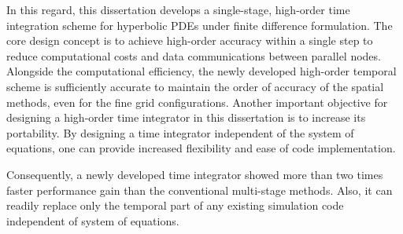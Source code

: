 In this regard, this dissertation develops a single-stage, high-order time integration scheme
for hyperbolic PDEs under finite difference formulation. The core design concept
is to achieve high-order accuracy within a single step
to reduce computational costs and data communications between parallel nodes.
Alongside the computational efficiency, the newly developed high-order temporal scheme is
sufficiently accurate to maintain the order of accuracy of the spatial methods,
even for the fine grid configurations.
Another important objective for designing a high-order time integrator in this dissertation is
to increase its portability. By designing a time integrator independent of the system of equations,
one can provide increased flexibility and ease of code implementation.

Consequently, a newly developed time integrator showed more than two times faster performance gain
than the conventional multi-stage methods.
Also, it can readily replace only the temporal part of any existing simulation code
independent of system of equations.
